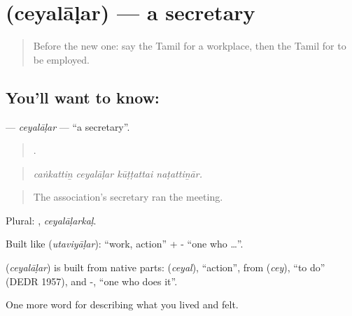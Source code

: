 \section[\texorpdfstring{\ta{செயலாளர்} (ceyalāḷar)}{செயலாளர் (ceyalāḷar)}]{ (ceyalāḷar) — a secretary}

\label{lesson:TA-C507-ceyalalar}



\begin{quote}
Before the new one: say the Tamil for a workplace, then the Tamil for to be employed.
\end{quote}

\subsection*{You'll want to know: }
\textbf{} — \emph{ceyalāḷar} — \textquotedblleft{}a secretary\textquotedblright{}.

\begin{quote}
   .
\end{quote}

\begin{quote}
\emph{caṅkattiṉ ceyalāḷar kūṭṭattai naṭattiṉār.}
\end{quote}

\begin{quote}
The association's secretary ran the meeting.
\end{quote}

Plural: , \emph{ceyalāḷarkaḷ}.

Built like  (\emph{utaviyāḷar}):  \textquotedblleft{}work, action\textquotedblright{} + - \textquotedblleft{}one who …\textquotedblright{}.

\begin{cousinweb}
\textbf{} (\emph{ceyalāḷar}) is built from native parts:  (\emph{ceyal}), \textquotedblleft{}action\textquotedblright{}, from  (\emph{cey}), \textquotedblleft{}to do\textquotedblright{} (DEDR 1957), and -, \textquotedblleft{}one who does it\textquotedblright{}.
\end{cousinweb}

\begin{grammarlens}[title={What you've built}]
One more word for describing what you lived and felt.
\end{grammarlens}

